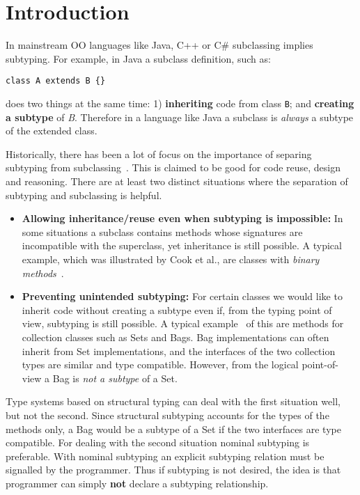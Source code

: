 \section{Introduction}

In mainstream OO languages like Java, C++ or C\# subclassing 
implies subtyping. For example, in Java a subclass definition, such as:

\begin{lstlisting}
class A extends B {}
\end{lstlisting}

\noindent does two things at the same time:
1) {\bf inheriting} code from class \lstinline{B}; and {\bf creating 
a subtype} of \emph{B}. Therefore in a language like Java 
a subclass is \emph{always} a subtype of the extended class.

Historically, there has been a lot of focus on the importance of
separing subtyping from subclassing~\cite{cook}.  This is claimed to be
good for code reuse, design and reasoning. There are at
least two distinct situations where the separation of subtyping and 
subclassing is helpful.

\begin{itemize}

\item {\bf Allowing inheritance/reuse even when subtyping is impossible:} 
In some situations a subclass contains methods whose signatures 
are incompatible with the superclass, yet inheritance is still
possible. A typical example, which was illustrated by Cook et al., are 
classes with \emph{binary methods}~\cite{}.

\item {\bf Preventing unintended subtyping:} For certain classes we
  would like to inherit code without creating a subtype even if, from
  the typing point of view, subtyping is still possible. A typical
  example~\cite{} of this are methods for collection classes such as Sets and
  Bags. Bag implementations can often inherit 
  from Set implementations, and the interfaces of the two collection types are
  similar and type compatible. 
  However, from the logical point-of-view a Bag is \emph{not a
    subtype} of a Set. 

\end{itemize}

Type systems based on structural typing can deal with the first
situation well, but not the second. Since structural subtyping
accounts for the types of the methods only, a Bag would be a subtype
of a Set if the two interfaces are type compatible. For dealing with
the second situation nominal subtyping is preferable. With nominal
subtyping an explicit subtyping relation must be signalled by the
programmer. Thus if subtyping is not desired, the idea is that 
programmer can simply {\bf not} declare a subtyping relationship.

